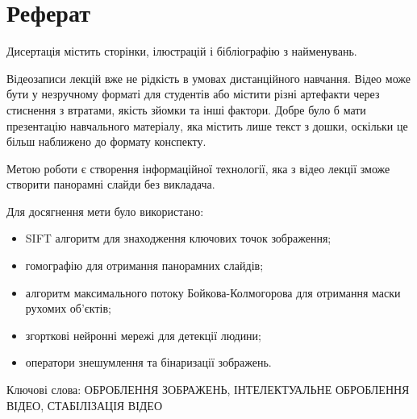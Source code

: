 \chapter*{Реферат}

Дисертація містить
\pageref{LastPage}
сторінки,
ілюстрацій
і бібліографію з
найменувань.

Відеозаписи лекцій вже не рідкість в умовах дистанційного навчання.
Відео може бути у незручному форматі для студентів або містити різні артефакти
через стиснення з втратами, якість зйомки та  інші фактори. Добре було б мати
презентацію навчального матеріалу, яка містить лише текст з дошки,
оскільки це більш наближено до формату конспекту.

Метою роботи є створення інформаційної технології, яка з відео лекції
зможе створити панорамні слайди без викладача.

Для досягнення мети було використано:
\begin{itemize}
  \item
        SIFT алгоритм для знаходження ключових точок зображення;
  \item   
        гомографію для отримання панорамних слайдів;
  \item
        алгоритм максимального потоку Бойкова-Колмогорова
        для отримання маски рухомих об'єктів;
  \item
        згорткові нейронні мережі для детекції людини;
  \item
        оператори знешумлення та бінаризації зображень.
\end{itemize}

Ключові слова:
\MakeUppercase{оброблення зображень, інтелектуальне оброблення відео,
  стабілізація відео}

